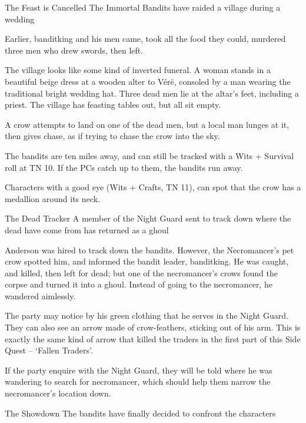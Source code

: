 \begin{multicols}{2}
{The Feast is Cancelled}%
{The Immortal Bandits have raided a village during a wedding}%

Earlier, \gls{banditking} and his men came, took all the food they could, murdered three men who drew swords, then left.

\begin{boxtext}

	The village looks like some kind of inverted funeral.
	A woman stands in a beautiful beige dress at a wooden alter to V\'{e}r\"{e}, consoled by a man wearing the traditional bright wedding hat.
	Three dead men lie at the altar's feet, including a priest.
	The village has feasting tables out, but all sit empty.

	A crow attempts to land on one of the dead men, but a local man lunges at it, then gives chase, as if trying to chase the crow into the sky.

\end{boxtext}

The bandits are ten miles away, and can still be tracked with a Wits + Survival roll at TN 10.
If the PCs catch up to them, the bandits run away.

Characters with a good eye (Wits + Crafts, TN 11), can spot that the crow has a medallion around its neck.

{The Dead Tracker}%
{A member of the Night Guard sent to track down where the dead have come from has returned as a ghoul}%

Anderson was hired to track down the bandits.
However, the Necromancer's pet crow spotted him, and informed the bandit leader, \gls{banditking}.
He was caught, and killed, then left for dead; but one of the necromancer's crows found the corpse and turned it into a ghoul.
Instead of going to the necromancer, he wandered aimlessly.

The party may notice by his green clothing that he serves in the Night Guard.
They can also see an arrow made of crow-feathers, sticking out of his arm.
This is exactly the same kind of arrow that killed the traders in the first part of this Side Quest -- `Fallen Traders'.


If the party enquire with the Night Guard, they will be told where he was wandering to search for \gls{necromancer}, which should help them narrow the necromancer's location down.

{The Showdown}%
{The bandits have finally decided to confront the characters}%


\end{multicols}
